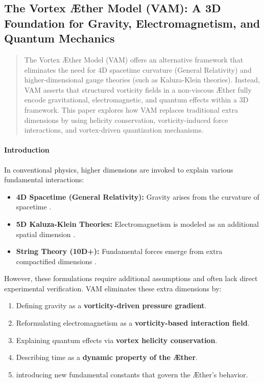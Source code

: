 


\subsection{The Vortex Æther Model (VAM): A 3D Foundation for Gravity, Electromagnetism, and Quantum Mechanics}\label{subsec:the-vortex-ther-model-(vam):-a-3d-foundation-for-gravity-electromagnetism-and-quantum-mechanics}


\begin{abstract}
        The Vortex Æther Model (VAM) offers an alternative framework that eliminates the need for 4D spacetime curvature (General Relativity) and higher-dimensional gauge theories (such as Kaluza-Klein theories). Instead, VAM asserts that structured vorticity fields in a non-viscous Æther fully encode gravitational, electromagnetic, and quantum effects within a 3D framework. This paper explores how VAM replaces traditional extra dimensions by using helicity conservation, vorticity-induced force interactions, and vortex-driven quantization mechanisms.
    \end{abstract}

    \paragraph*{Introduction}
    In conventional physics, higher dimensions are invoked to explain various fundamental interactions:
    \begin{itemize}
        \item \textbf{4D Spacetime (General Relativity):} Gravity arises from the curvature of spacetime \cite{Einstein1915}.
        \item \textbf{5D Kaluza-Klein Theories:} Electromagnetism is modeled as an additional spatial dimension \cite{Kaluza1921, Klein1926}.
        \item \textbf{String Theory (10D+):} Fundamental forces emerge from extra compactified dimensions \cite{Polchinski1998}.
    \end{itemize}
    However, these formulations require additional assumptions and often lack direct experimental verification. VAM eliminates these extra dimensions by:
    \begin{enumerate}
        \item Defining gravity as a \textbf{vorticity-driven pressure gradient}.
        \item Reformulating electromagnetism as a \textbf{vorticity-based interaction field}.
        \item Explaining quantum effects via \textbf{vortex helicity conservation}.
        \item Describing time as a \textbf{dynamic property of the Æther}.
        \item introducing new fundamental constants that govern the Æther's behavior.
    \end{enumerate}


